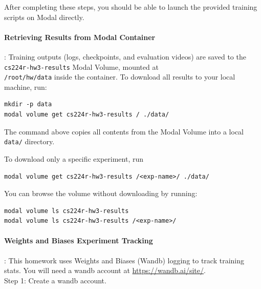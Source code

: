 \documentclass[12pt]{article}
\begin{document}
After completing these steps, you should be able to launch the provided training scripts on Modal directly.

\noindent\paragraph{Retrieving Results from Modal Container}: 
Training outputs (logs, checkpoints, and evaluation videos) are saved to the \texttt{cs224r-hw3-results} Modal Volume, mounted at \\
\texttt{/root/hw/data} inside the container.
To download all results to your local machine, run:
\begin{tcolorbox}[width=\linewidth, sharp corners=all, colback=white!95!black]
\begin{verbatim}
mkdir -p data
modal volume get cs224r-hw3-results / ./data/
\end{verbatim}
\end{tcolorbox}

The command above copies all contents from the Modal Volume into a local \texttt{data/} directory.

To download only a specific experiment, run
\begin{tcolorbox}[width=\linewidth, sharp corners=all, colback=white!95!black]
\begin{verbatim}
modal volume get cs224r-hw3-results /<exp-name>/ ./data/
\end{verbatim}
\end{tcolorbox}

You can browse the volume without downloading by running:

\begin{tcolorbox}[width=\linewidth, sharp corners=all, colback=white!95!black]
\begin{verbatim}
modal volume ls cs224r-hw3-results
modal volume ls cs224r-hw3-results /<exp-name>/
\end{verbatim}
\end{tcolorbox}

\noindent\paragraph{Weights and Biases Experiment Tracking}: This homework uses Weights and Biases (Wandb) logging to track training stats. You will need a wandb account at \url{https://wandb.ai/site/}. \\

\noindent Step 1: Create a wandb account.
 
\end{document}
